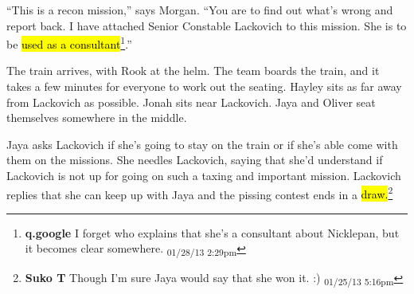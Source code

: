 ``This is a recon mission,'' says Morgan.  ``You are to find out what's wrong and report back.  I have attached Senior Constable Lackovich to this mission.  She is to be \hl{used as a consultant}\footnote{\textbf{q.google }I forget who explains that she's a consultant about Nicklepan, but it becomes clear somewhere. \textsubscript{01/28/13 2:29pm}}.''



The train arrives, with Rook at the helm.  The team boards the train, and it takes a few minutes for everyone to work out the seating.  Hayley sits as far away from Lackovich as possible.  Jonah sits near Lackovich.  Jaya and Oliver seat themselves somewhere in the middle.



Jaya asks Lackovich if she's going to stay on the train or if she's able come with them on the missions.  She needles Lackovich, saying that she'd understand if Lackovich is not up for going on such a taxing and important mission.  Lackovich replies that she can keep up with Jaya and the pissing contest ends in a \hl{draw.}\footnote{\textbf{Suko T }Though I'm sure Jaya would say that she won it. :) \textsubscript{01/25/13 5:16pm}}



